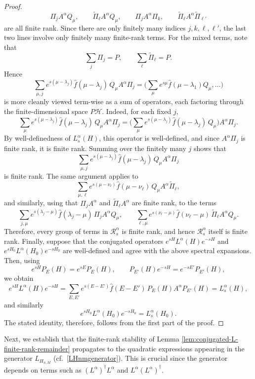 \documentclass[11pt]{amsart}
\newcommand{\1}{\mathbbm{1}}
\theoremstyle{plain}
\theoremstyle{definition}
\theoremstyle{remark}
\numberwithin{equation}{section}
\begin{document}
\begin{proof}
\[
\Pi_j A^\alpha Q_\mu,\qquad
\widetilde\Pi_\ell A^\alpha Q_\mu,\qquad
\Pi_j A^\alpha \Pi_k,\qquad
\widetilde\Pi_\ell A^\alpha \widetilde\Pi_{\ell'}
\]
are all finite rank. Since there are only finitely many indices \(j,k,\ell,\ell'\), the last two lines involve only finitely many finite-rank terms. For the mixed terms, note that
\[
\sum_j \Pi_j=P,
\qquad
\sum_\ell \widetilde\Pi_\ell=P.
\]
Hence
\[
\sum_{\mu,j} e^{s(\mu-\lambda_j)}\widehat f(\mu-\lambda_j)\,Q_\mu A^\alpha \Pi_j
=
\Big(\sum_{\mu} e^{s\mu} \widehat f(\mu-\lambda_1)Q_\mu,\ldots\Big)
\]
is more cleanly viewed term-wise as a sum of operators, each factoring through the finite-dimensional space \(P\mathcal H\). Indeed, for each fixed \(j\),
\[
\sum_\mu e^{s(\mu-\lambda_j)}\widehat f(\mu-\lambda_j)\,Q_\mu A^\alpha \Pi_j
=
\Big(\sum_\mu e^{s(\mu-\lambda_j)}\widehat f(\mu-\lambda_j)\,Q_\mu\Big)A^\alpha \Pi_j.
\]
By well-definedness of \(L_s^\alpha(H)\), this operator is well-defined, and since \(A^\alpha \Pi_j\) is finite rank, it is finite rank. Summing over the finitely many \(j\) shows that
\[
\sum_{\mu,j} e^{s(\mu-\lambda_j)}\widehat f(\mu-\lambda_j)\,Q_\mu A^\alpha \Pi_j
\]
is finite rank. The same argument applies to
\[
\sum_{\mu,\ell} e^{s(\mu-\nu_\ell)}\widehat f(\mu-\nu_\ell)\,Q_\mu A^\alpha \widetilde\Pi_\ell,
\]
and similarly, using that \(\Pi_j A^\alpha\) and \(\widetilde\Pi_\ell A^\alpha\) are finite rank, to the terms
\[
\sum_{j,\mu} e^{s(\lambda_j-\mu)}\widehat f(\lambda_j-\mu)\,\Pi_j A^\alpha Q_\mu,
\qquad
\sum_{\ell,\mu} e^{s(\nu_\ell-\mu)}\widehat f(\nu_\ell-\mu)\,\widetilde\Pi_\ell A^\alpha Q_\mu.
\]
Therefore, every group of terms in \(\mathcal R_s^\alpha\) is finite rank, and hence \(\mathcal R_s^\alpha\) itself is finite rank. Finally, suppose that the conjugated operators \(e^{sH}L^\alpha(H)e^{-sH}\) and \(e^{sH_0}L^\alpha(H_0)e^{-sH_0}\) are well-defined and agree with the above spectral expansions. Then, using
\[
e^{sH}P_E(H)=e^{sE}P_E(H),
\qquad
P_{E'}(H)e^{-sH}=e^{-sE'}P_{E'}(H),
\]
we obtain
\[
e^{sH}L^\alpha(H)e^{-sH}
=
\sum_{E,E'} e^{s(E-E')}\widehat f(E-E')\,P_E(H)A^\alpha P_{E'}(H)
=
L_s^\alpha(H),
\]
and similarly
\[
e^{sH_0}L^\alpha(H_0)e^{-sH_0}=L_s^\alpha(H_0).
\]
The stated identity, therefore, follows from the first part of the proof. 
\end{proof}


\noindent Next, we establish that the finite-rank stability of Lemma \ref{lem:conjugated-L-finite-rank-remainder} propagates to the quadratic expressions appearing in the generator $L_{H_{n,M}}$ (cf.~\eqref{LHnmgenerator}). This is crucial since the generator depends on terms such as \((L^\alpha)^\dagger L^\alpha\) and \(L^\alpha (L^\alpha)^\dagger\).
\end{document}
